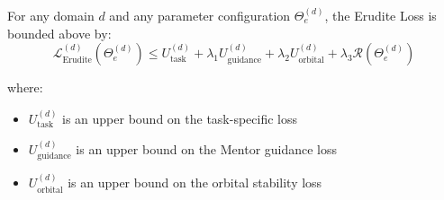 \begin{theorem}
For any domain $d$ and any parameter configuration $\Theta_e^{(d)}$, the Erudite Loss is bounded above by:
\begin{equation}
\mathcal{L}_{\text{Erudite}}^{(d)}(\Theta_e^{(d)}) \leq U_{\text{task}}^{(d)} + \lambda_1 U_{\text{guidance}}^{(d)} + \lambda_2 U_{\text{orbital}}^{(d)} + \lambda_3 \mathcal{R}(\Theta_e^{(d)})
\end{equation}

where:
\begin{itemize}
    \item $U_{\text{task}}^{(d)}$ is an upper bound on the task-specific loss
    \item $U_{\text{guidance}}^{(d)}$ is an upper bound on the Mentor guidance loss
    \item $U_{\text{orbital}}^{(d)}$ is an upper bound on the orbital stability loss
\end{itemize}
\end{theorem}

